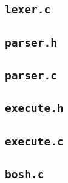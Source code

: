 \subsection{\texttt{lexer.c}}


\subsection{\texttt{parser.h}}


\subsection{\texttt{parser.c}}


\subsection{\texttt{execute.h}}


\subsection{\texttt{execute.c}}


\subsection{\texttt{bosh.c}}

